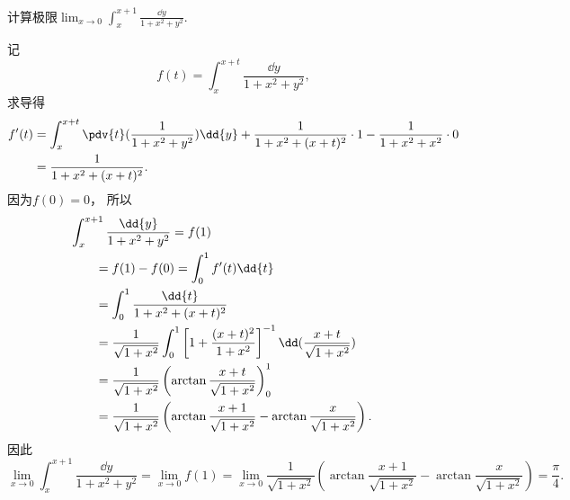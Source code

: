 \begin{example}
计算极限\(\lim_{x\to0} \int_x^{x+1} \frac{\dd{y}}{1+x^2+y^2}\).
\begin{solution}
记\begin{equation*}
	f(t) = \int_x^{x+t} \frac{\dd{y}}{1+x^2+y^2},
\end{equation*}
求导得\begin{align*}
	f'(t)
	&= \int_x^{x+t} \pdv{t}(\frac{1}{1+x^2+y^2}) \dd{y}
	+ \frac{1}{1+x^2+(x+t)^2} \cdot 1
	- \frac{1}{1+x^2+x^2} \cdot 0 \\
	&= \frac{1}{1+x^2+(x+t)^2}.
\end{align*}
因为\(f(0) = 0\)，
所以
\begin{align*}
	&\hspace{-20pt}
	\int_x^{x+1} \frac{\dd{y}}{1+x^2+y^2}
	= f(1) \\
	&= f(1) - f(0)
	= \int_0^1 f'(t) \dd{t} \\
	&= \int_0^1 \frac{\dd{t}}{1+x^2+(x+t)^2} \\
	&= \frac{1}{\sqrt{1+x^2}}
		\int_0^1 \left[1+\frac{(x+t)^2}{1+x^2}\right]^{-1} \dd(\frac{x+t}{\sqrt{1+x^2}}) \\
	&= \frac{1}{\sqrt{1+x^2}}
		\left(\arctan\frac{x+t}{\sqrt{1+x^2}}\right)_0^1 \\
	&= \frac{1}{\sqrt{1+x^2}}
		\left(
			\arctan\frac{x+1}{\sqrt{1+x^2}}
			- \arctan\frac{x}{\sqrt{1+x^2}}
		\right).
\end{align*}
因此\begin{equation*}
	\lim_{x\to0} \int_x^{x+1} \frac{\dd{y}}{1+x^2+y^2}
	= \lim_{x\to0} f(1)
	= \lim_{x\to0} \frac{1}{\sqrt{1+x^2}} \left(
		\arctan\frac{x+1}{\sqrt{1+x^2}}
		- \arctan\frac{x}{\sqrt{1+x^2}}
	\right)
	= \frac{\pi}{4}.
\end{equation*}
\end{solution}
\end{example}

